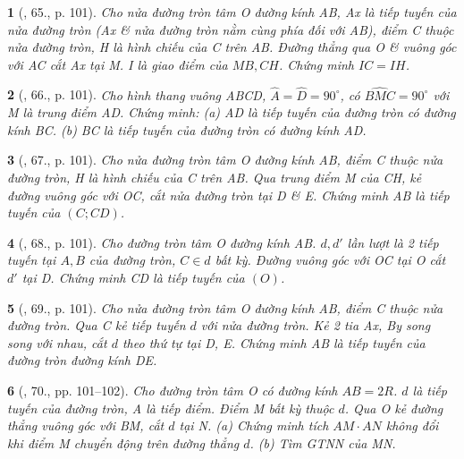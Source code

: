 \documentclass{article}
\newtheorem{baitoan}{}
\begin{document}
\begin{baitoan}[\cite{Binh_Toan_9_tap_1}, 65., p. 101]
	Cho nửa đường tròn tâm O đường kính AB, Ax là tiếp tuyến của nửa đường tròn (Ax \& nửa đường tròn nằm cùng phía đối với AB), điểm C thuộc nửa đường tròn, H là hình chiếu của C trên AB. Đường thẳng qua O \& vuông góc với AC cắt Ax tại M. I là giao điểm của $MB,CH$. Chứng minh $IC = IH$.
\end{baitoan}

\begin{baitoan}[\cite{Binh_Toan_9_tap_1}, 66., p. 101]
	Cho hình thang vuông ABCD, $\widehat{A} = \widehat{D} = 90^\circ$, có $\widehat{BMC} = 90^\circ$ với M là trung điểm AD. Chứng minh: (a) AD là tiếp tuyến của đường tròn có đường kính BC. (b) BC là tiếp tuyến của đường tròn có đường kính AD.
\end{baitoan}

\begin{baitoan}[\cite{Binh_Toan_9_tap_1}, 67., p. 101]
	Cho nửa đường tròn tâm O đường kính AB, điểm C thuộc nửa đường tròn, H là hình chiếu của C trên AB. Qua trung điểm M của CH, kẻ đường vuông góc với OC, cắt nửa đường tròn tại D \& E. Chứng minh AB là tiếp tuyến của $(C;CD)$.
\end{baitoan}

\begin{baitoan}[\cite{Binh_Toan_9_tap_1}, 68., p. 101]
	Cho đường tròn tâm O đường kính AB. $d,d'$ lần lượt là 2 tiếp tuyến tại $A,B$ của đường tròn, $C\in d$ bất kỳ. Đường vuông góc với OC tại O cắt $d'$ tại D. Chứng minh CD là tiếp tuyến của $(O)$.
\end{baitoan}

\begin{baitoan}[\cite{Binh_Toan_9_tap_1}, 69., p. 101]
	Cho nửa đường tròn tâm O đường kính AB, điểm C thuộc nửa đường tròn. Qua C kẻ tiếp tuyến $d$ với nửa đường tròn. Kẻ 2 tia Ax, By song song với nhau, cắt $d$ theo thứ tự tại D, E. Chứng minh AB là tiếp tuyến của đường tròn đường kính DE.
\end{baitoan}

\begin{baitoan}[\cite{Binh_Toan_9_tap_1}, 70., pp. 101--102]
	Cho đường tròn tâm O có đường kính $AB = 2R$. $d$ là tiếp tuyến của đường tròn, A là tiếp điểm. Điểm M bất kỳ thuộc $d$. Qua O kẻ đường thẳng vuông góc với BM, cắt $d$ tại N. (a) Chứng minh tích $AM\cdot AN$ không đổi khi điểm M chuyển động trên đường thẳng $d$. (b) Tìm {\rm GTNN} của MN.
\end{baitoan}
\end{document}
